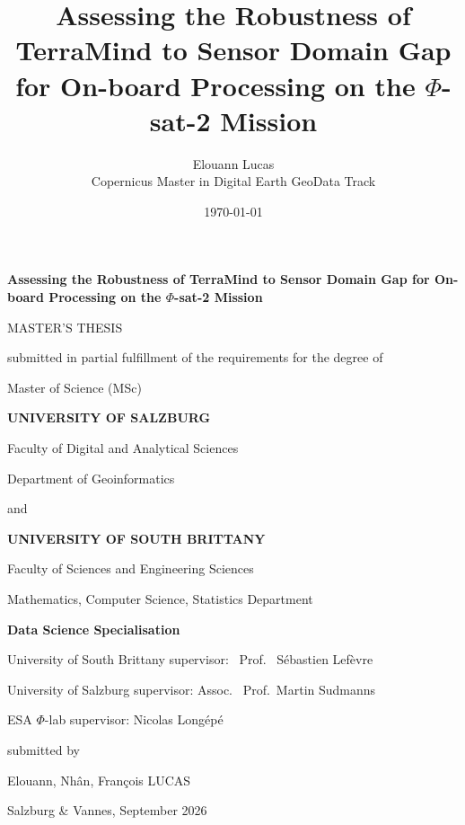 \documentclass[12pt, a4paper]{report} %
\title{Assessing the Robustness of TerraMind to Sensor Domain Gap for On-board Processing on the $\Phi$-sat-2 Mission} %
\author{Elouann Lucas \\ Copernicus Master in Digital Earth GeoData Track} %
\date{\today}
\begin{document}
\begin{titlepage}
    \centering
    \vspace*{1cm}
    {\huge\bfseries Assessing the Robustness of TerraMind to Sensor Domain Gap for On-board Processing on the $\Phi$-sat-2 Mission\par} %

    \vspace{1.5cm}
    {\Large MASTER'S THESIS\par} %

    submitted in partial fulfillment of the requirements for the degree of\par %
    {\large Master of Science (MSc)\par} %

    \vspace{1.5cm}
    {\large\textbf{UNIVERSITY OF SALZBURG}\par} %
    Faculty of Digital and Analytical Sciences\par %
    Department of Geoinformatics\par %

    \vspace{0.5cm}
    and\par %

    \vspace{0.5cm}
    {\large\textbf{UNIVERSITY OF SOUTH BRITTANY}\par} %
    Faculty of Sciences and Engineering Sciences\par %
    Mathematics, Computer Science, Statistics Department\par %
    \textbf{Data Science Specialisation}\par %

    \vspace{1.5cm}
    \begin{center}
        University of South Brittany supervisor: \ Prof.
        \ Sébastien Lefèvre\par %
        University of Salzburg supervisor: Assoc.
        \ Prof.\ Martin Sudmanns\par %
        ESA $\Phi$-lab supervisor: Nicolas Longépé\par \end{center}

    \centering submitted by\par {\large Elouann, Nhân, François LUCAS\par}

    \vspace{3cm} Salzburg \& Vannes, September 2026\par \end{titlepage}
\end{document}
